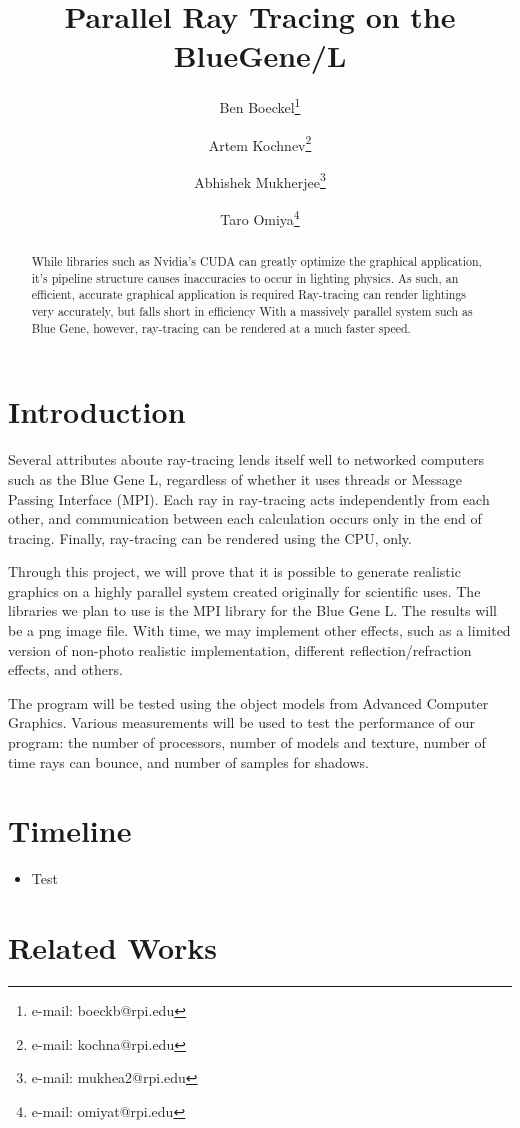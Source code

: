 \documentclass{acmsiggraph}
\title{Parallel Ray Tracing on the BlueGene/L}
\author{%
Ben Boeckel\thanks{e-mail: boeckb@rpi.edu} %
\and Artem Kochnev\thanks{e-mail: kochna@rpi.edu} %
\and Abhishek Mukherjee\thanks{e-mail: mukhea2@rpi.edu} %
\and Taro Omiya\thanks{e-mail: omiyat@rpi.edu}}
\begin{document}
\maketitle

\begin{abstract}
While libraries such as Nvidia's CUDA can greatly optimize the graphical
application, it's pipeline structure causes inaccuracies to occur in lighting
physics.  As such, an efficient, accurate graphical application is required
Ray-tracing can render lightings very accurately, but falls short in efficiency
With a massively parallel system such as Blue Gene, however, ray-tracing can be
rendered at a much faster speed.
\end{abstract}
\keywordlist

\section{Introduction}
Several attributes aboute ray-tracing lends itself well to networked computers
such as the Blue Gene L, regardless of whether it uses threads or Message
Passing Interface (MPI).  Each ray in ray-tracing acts independently from each
other, and communication between each calculation occurs only in the end of
tracing.  Finally, ray-tracing can be rendered using the CPU, only.

Through this project, we will prove that it is possible to generate realistic
graphics on a highly parallel system created originally for scientific uses.
The libraries we plan to use is the MPI library for the Blue Gene L.
The results will be a png image file.  With time, we may implement other
effects, such as a limited version of non-photo realistic implementation,
different reflection/refraction effects, and others.

The program will be tested using the object models from Advanced Computer
Graphics.  Various measurements will be used to test the performance of our
program: the number of processors, number of models and texture, number of time
rays can bounce, and number of samples for shadows.

\section*{Timeline}
\begin{itemize}
\item Test
\end{itemize}

\section*{Related Works}
\end{document}
